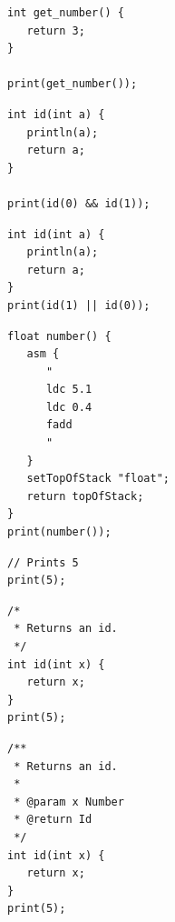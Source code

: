 \begin{lstlisting}[frame=htrbl, caption={Implementation of {\ttfamily simple.e}}, label={lst:simple}, basicstyle=\footnotesize]
int get_number() {
   return 3;
}

print(get_number());
\end{lstlisting}

\begin{lstlisting}[frame=htrbl, caption={Implementation of {\ttfamily lazy\_eval\_and.e}}, label={lst:lazyand}, basicstyle=\footnotesize]
int id(int a) {
   println(a);
   return a;
}

print(id(0) && id(1));
\end{lstlisting}

\begin{lstlisting}[frame=htrbl, caption={Implementation of {\ttfamily lazy\_eval\_or.e}}, label={lst:lazyor}, basicstyle=\footnotesize]
int id(int a) {
   println(a);
   return a;
}
print(id(1) || id(0));
\end{lstlisting}

\begin{lstlisting}[frame=htrbl, caption={Implementation of {\ttfamily inline\_asm.e}}, label={lst:inlineAsm}, basicstyle=\footnotesize]
float number() {
   asm {
      "
      ldc 5.1
      ldc 0.4
      fadd
      "
   }
   setTopOfStack "float";
   return topOfStack;
}
print(number());
\end{lstlisting}

\begin{lstlisting}[frame=htrbl, caption={Implementation of {\ttfamily line\_comment.e}}, label={lst:lineC}, basicstyle=\footnotesize]
// Prints 5
print(5);
\end{lstlisting}

\begin{lstlisting}[frame=htrbl, caption={Implementation of {\ttfamily multiline\_comment.e}}, label={lst:multilineC}, basicstyle=\footnotesize]
/*
 * Returns an id.
 */
int id(int x) {
   return x;
}
print(5);
\end{lstlisting}

\begin{lstlisting}[frame=htrbl, caption={Implementation of {\ttfamily special\_comment.e}}, label={lst:specialC}, basicstyle=\footnotesize]
/**
 * Returns an id.
 *
 * @param x Number
 * @return Id
 */
int id(int x) {
   return x;
}
print(5);
\end{lstlisting}
